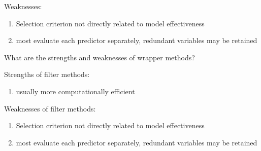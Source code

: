 \documentclass[10pt]{book}
\begin{document}
Weaknesses:
\begin{enumerate}
  \item Selection criterion not directly related to model effectiveness
  \item most evaluate each predictor separately, redundant variables may be retained
\end{enumerate}

\hrulefill

What are the strengths and weaknesses of wrapper methods?

Strengths of filter methods:
\begin{enumerate}
  \item usually more computationally efficient
\end{enumerate}

Weaknesses of filter methods:
\begin{enumerate}
  \item Selection criterion not directly related to model effectiveness
  \item most evaluate each predictor separately, redundant variables may be retained
\end{enumerate}




\end{document}
